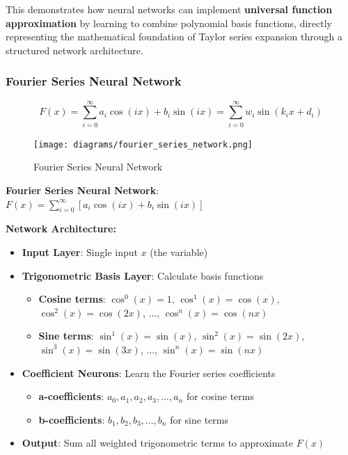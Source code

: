 This demonstrates how neural networks can implement \textbf{universal function approximation} by learning to combine polynomial basis functions, directly representing the mathematical foundation of Taylor series expansion through a structured network architecture.

\subsubsection{Fourier Series Neural Network}

\begin{equation}
F(x) = \sum_{i=0}^{\infty} a_i \cos(ix) + b_i \sin(ix) = \sum_{i=0}^{\infty} w_i \sin(k_i x + d_i)
\end{equation}

\begin{figure}[h!]
\centering
\texttt{[image: diagrams/fourier\_series\_network.png]}
\caption{Fourier Series Neural Network}
\end{figure}

\textbf{Fourier Series Neural Network}: $F(x) = \sum_{i=0}^{\infty} \left[a_i \cos(ix) + b_i \sin(ix)\right]$

\textbf{Network Architecture:}

\begin{itemize}
\item \textbf{Input Layer}: Single input $x$ (the variable)
\item \textbf{Trigonometric Basis Layer}: Calculate basis functions
\begin{itemize}
\item \textbf{Cosine terms}: $\cos^0(x) = 1$, $\cos^1(x) = \cos(x)$, $\cos^2(x) = \cos(2x)$, $\ldots$, $\cos^n(x) = \cos(nx)$
\item \textbf{Sine terms}: $\sin^1(x) = \sin(x)$, $\sin^2(x) = \sin(2x)$, $\sin^3(x) = \sin(3x)$, $\ldots$, $\sin^n(x) = \sin(nx)$
\end{itemize}
\item \textbf{Coefficient Neurons}: Learn the Fourier series coefficients
\begin{itemize}
\item \textbf{a-coefficients}: $a_0, a_1, a_2, a_3, \ldots, a_n$ for cosine terms
\item \textbf{b-coefficients}: $b_1, b_2, b_3, \ldots, b_n$ for sine terms
\end{itemize}
\item \textbf{Output}: Sum all weighted trigonometric terms to approximate $F(x)$
\end{itemize}

